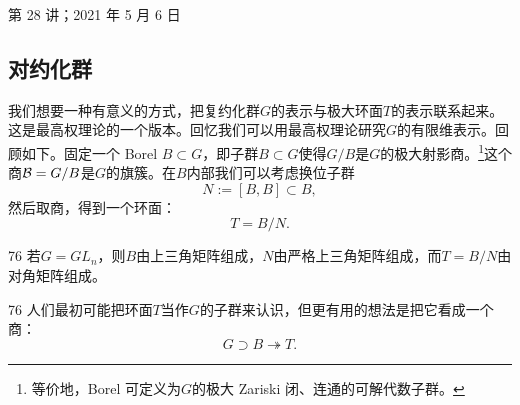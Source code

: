 \begin{flushright}\small 第 28 讲；2021 年 5 月 6 日\end{flushright}

\subsection{对约化群}\label{sec:11-6-1}

我们想要一种有意义的方式，把复约化群$G$的表示与极大环面$T$的表示联系起来。这是最高权理论的一个版本。回忆我们可以用最高权理论研究$G$的有限维表示。回顾如下。固定一个 Borel $B\subset G$，即子群$B\subset G$使得$G/B$是$G$的极大射影商。\footnote{等价地，Borel 可定义为$G$的极大 Zariski 闭、连通的可解代数子群。}这个商$\mathcal{B}=G/B$是$G$的旗簇。在$B$内部我们可以考虑换位子群
\begin{equation}\tag{11.107}
N:=[B,B]\subset B,
\end{equation}
然后取商，得到一个环面：
\begin{equation}\tag{11.108}
T=B/N.
\end{equation}

\begin{srcex}{76}
若$G=GL_n$，则$B$由上三角矩阵组成，$N$由严格上三角矩阵组成，而$T=B/N$由对角矩阵组成。
\end{srcex}

\begin{srcrem}{76}
人们最初可能把环面$T$当作$G$的子群来认识，但更有用的想法是把它看成一个商：
\begin{equation}\tag{11.109}
G\supset B\twoheadrightarrow T.
\end{equation}
\end{srcrem}

